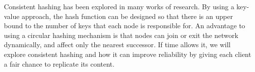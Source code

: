 Consistent hashing has been explored in many works of research.
By using a key-value approach, the hash function can be designed
so that there is an upper bound to the number of keys that each
node is responsible for. An advantage to using a circular hashing
mechanism is that nodes can join or exit the network
dynamically, and affect only the nearest successor\cite{chord}.
If time allows it, we will explore consistent hashing and how
it can improve reliability by giving each client a fair chance
to replicate its content.

\label{background}
